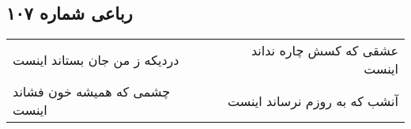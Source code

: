 \begin{center}
\section*{رباعی شماره ۱۰۷}
\label{sec:sh107}
\begin{longtable}{l p{0.5cm} r}
دردیکه ز من جان بستاند اینست
&&
عشقی که کسش چاره نداند اینست
\\
چشمی که همیشه خون فشاند اینست
&&
آنشب که به روزم نرساند اینست
\\
\end{longtable}
\end{center}
